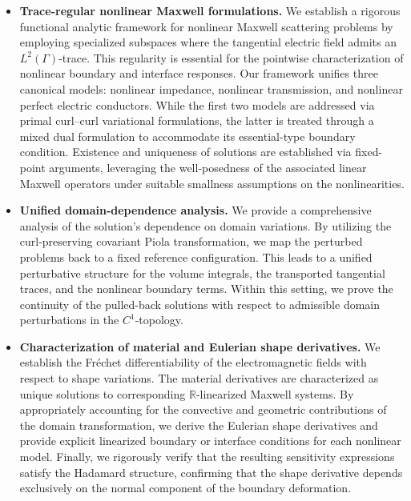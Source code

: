 \documentclass[12pt,reqno]{amsart}
\theoremstyle{definition}
\numberwithin{equation}{section}
\begin{document}
\begin{itemize}
    \item \textbf{Trace-regular nonlinear Maxwell formulations.} We establish a rigorous functional analytic framework for nonlinear Maxwell scattering problems by employing specialized subspaces where the tangential electric field admits an $L^2(\Gamma)$-trace. This regularity is essential for the pointwise characterization of nonlinear boundary and interface responses. Our framework unifies three canonical models: nonlinear impedance, nonlinear transmission, and nonlinear perfect electric conductors. While the first two models are addressed via primal curl--curl variational formulations, the latter is treated through a mixed dual formulation to accommodate its essential-type boundary condition. Existence and uniqueness of solutions are established via fixed-point arguments, leveraging the well-posedness of the associated linear Maxwell operators under suitable smallness assumptions on the nonlinearities.

    \item \textbf{Unified domain-dependence analysis.} We provide a comprehensive analysis of the solution's dependence on domain variations. By utilizing the curl-preserving covariant Piola transformation, we map the perturbed problems back to a fixed reference configuration. This leads to a unified perturbative structure for the volume integrals, the transported tangential traces, and the nonlinear boundary terms. Within this setting, we prove the continuity of the pulled-back solutions with respect to admissible domain perturbations in the $C^1$-topology.

    \item \textbf{Characterization of material and Eulerian shape derivatives.} We establish the Fr\'echet differentiability of the electromagnetic fields with respect to shape variations. The material derivatives are characterized as unique solutions to corresponding $\mathbb{R}$-linearized Maxwell systems. By appropriately accounting for the convective and geometric contributions of the domain transformation, we derive the Eulerian shape derivatives and provide explicit linearized boundary or interface conditions for each nonlinear model. Finally, we rigorously verify that the resulting sensitivity expressions satisfy the Hadamard structure, confirming that the shape derivative depends exclusively on the normal component of the boundary deformation.
\end{itemize}
\end{document}
